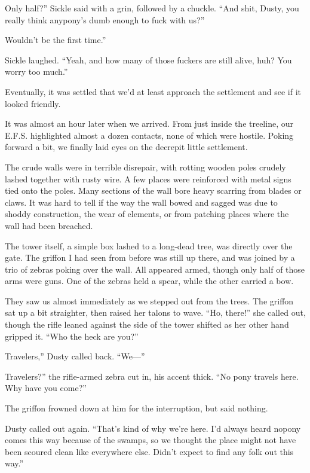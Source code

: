 \leavevmode{}Only half?” Sickle said with a grin, followed by a chuckle. “And shit, Dusty, you really think anypony’s dumb enough to fuck with us?”

\leavevmode{}Wouldn’t be the first time.”

Sickle laughed. “Yeah, and how many of those fuckers are still alive, huh? You worry too much.”

Eventually, it was settled that we’d at least approach the settlement and see if it looked friendly.

It was almost an hour later when we arrived. From just inside the treeline, our E.F.S. highlighted almost a dozen contacts, none of which were hostile. Poking forward a bit, we finally laid eyes on the decrepit little settlement.

The crude walls were in terrible disrepair, with rotting wooden poles crudely lashed together with rusty wire. A few places were reinforced with metal signs tied onto the poles. Many sections of the wall bore heavy scarring from blades or claws. It was hard to tell if the way the wall bowed and sagged was due to shoddy construction, the wear of elements, or from patching places where the wall had been breached.

The tower itself, a simple box lashed to a long-dead tree, was directly over the gate. The griffon I had seen from before was still up there, and was joined by a trio of zebras poking over the wall. All appeared armed, though only half of those arms were guns. One of the zebras held a spear, while the other carried a bow.

They saw us almost immediately as we stepped out from the trees. The griffon sat up a bit straighter, then raised her talons to wave. “Ho, there!” she called out, though the rifle leaned against the side of the tower shifted as her other hand gripped it. “Who the heck are you?”

\leavevmode{}Travelers,” Dusty called back. “We—”

\leavevmode{}Travelers?” the rifle-armed zebra cut in, his accent thick. “No pony travels here. Why have you come?”

The griffon frowned down at him for the interruption, but said nothing.

Dusty called out again. “That’s kind of why we’re here. I’d always heard nopony comes this way because of the swamps, so we thought the place might not have been scoured clean like everywhere else. Didn’t expect to find any folk out this way.”

